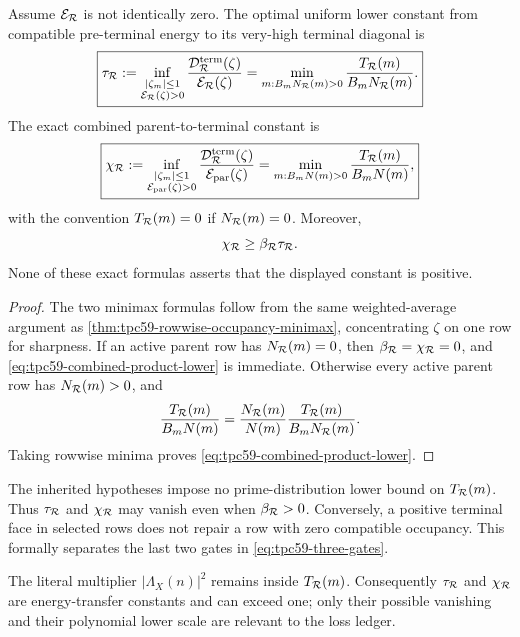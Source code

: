 \begin{proposition}
\label{prop:tpc59-terminal-activation-minimax}
Assume \(\mathcal E_{\mathcal R}\) is not identically zero.  The optimal uniform lower
constant from compatible pre-terminal energy to its very-high terminal
diagonal is
\begin{equation}
 \boxed{
 \tau_{\mathcal R}
 :=\inf_{\substack{|\zeta_m|\le1\\\mathcal E_{\mathcal R}(\zeta)>0}}
   \frac{\mathcal D_{\mathcal R}^{\rm term}(\zeta)}{\mathcal E_{\mathcal R}(\zeta)}
 =\min_{m:B_mN_{\mathcal R}(m)>0}
   \frac{T_{\mathcal R}(m)}{B_mN_{\mathcal R}(m)}.}
 \label{eq:tpc59-tau-R-minimax}
\end{equation}
The exact combined parent-to-terminal constant is
\begin{equation}
 \boxed{
 \chi_{\mathcal R}
 :=\inf_{\substack{|\zeta_m|\le1\\\mathcal E_{\rm par}(\zeta)>0}}
   \frac{\mathcal D_{\mathcal R}^{\rm term}(\zeta)}{\mathcal E_{\rm par}(\zeta)}
 =\min_{m:B_mN(m)>0}\frac{T_{\mathcal R}(m)}{B_mN(m)},}
 \label{eq:tpc59-combined-minimax}
\end{equation}
with the convention \(T_{\mathcal R}(m)=0\) if
\(N_{\mathcal R}(m)=0\).  Moreover,
\begin{equation}
 \chi_{\mathcal R}\ge\beta_{\mathcal R}\tau_{\mathcal R}.
 \label{eq:tpc59-combined-product-lower}
\end{equation}
None of these exact formulas asserts that the displayed constant is
positive.
\end{proposition}

\begin{proof}
The two minimax formulas follow from the same weighted-average argument as
\cref{thm:tpc59-rowwise-occupancy-minimax}, concentrating \(\zeta\) on one
row for sharpness.  If an active parent row has \(N_{\mathcal R}(m)=0\), then
\(\beta_{\mathcal R}=\chi_{\mathcal R}=0\), and
\eqref{eq:tpc59-combined-product-lower} is immediate.  Otherwise every
active parent row has \(N_{\mathcal R}(m)>0\), and
\[
 \frac{T_{\mathcal R}(m)}{B_mN(m)}
 =\frac{N_{\mathcal R}(m)}{N(m)}
  \frac{T_{\mathcal R}(m)}{B_mN_{\mathcal R}(m)}.
\]
Taking rowwise minima proves
\eqref{eq:tpc59-combined-product-lower}.
\end{proof}

The inherited hypotheses impose no prime-distribution lower bound on
\(T_{\mathcal R}(m)\).  Thus \(\tau_{\mathcal R}\) and \(\chi_{\mathcal R}\) may vanish even
when \(\beta_{\mathcal R}>0\).  Conversely, a positive terminal face in selected
rows does not repair a row with zero compatible occupancy.  This formally
separates the last two gates in \eqref{eq:tpc59-three-gates}.

\begin{remark}
The literal multiplier \(|\Lambda_X(n)|^2\) remains inside
\(T_{\mathcal R}(m)\).  Consequently \(\tau_{\mathcal R}\) and \(\chi_{\mathcal R}\) are
energy-transfer constants and can exceed one; only their possible vanishing
and their polynomial lower scale are relevant to the loss ledger.
\end{remark}
